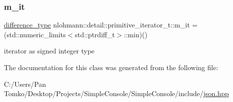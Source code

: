 \mbox{\label{classnlohmann_1_1detail_1_1primitive__iterator__t_a4357355113b0cd7e12b15c2e93703510}} 
\subsubsection{\texorpdfstring{m\_it}{m\_it}}
{\footnotesize\ttfamily \mbox{\hyperlink{classnlohmann_1_1detail_1_1primitive__iterator__t_af3db0d5c90de427d51645fe73a015553}{difference\+\_\+type}} nlohmann\+::detail\+::primitive\+\_\+iterator\+\_\+t\+::m\+\_\+it = (std\+::numeric\+\_\+limits$<$std\+::ptrdiff\+\_\+t$>$\+::min)()\hspace{0.3cm}{\ttfamily [private]}}



iterator as signed integer type 



The documentation for this class was generated from the following file\+:\begin{DoxyCompactItemize}
\item 
C\+:/\+Users/\+Pan Tomko/\+Desktop/\+Projects/\+Simple\+Console/\+Simple\+Console/include/\mbox{\hyperlink{json_8hpp}{json.\+hpp}}\end{DoxyCompactItemize}
